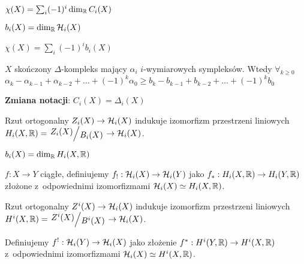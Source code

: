 

 


\begin{definicja}
	$\chi(X) = \sum_i (-1)^i \dim_{\mathbb{R}} C_i(X)$
\end{definicja}

\begin{definicja}
	$b_i(X) = \dim_{\mathbb{R}} {\mathcal{H}}_i(X)$
\end{definicja}

\begin{wniosek}
	$\chi(X) = \sum_i (-1)^i b_i(X)$
\end{wniosek}

\begin{wniosek}
	$X$ skończony $\Delta$-kompleks mający $\alpha_i$
	$i$-wymiarowych sympleksów. Wtedy $\forall_{k \geq 0}$
	${ \alpha_k - \alpha_{k-1} + \alpha_{k-2} + \ldots + (-1)^k \alpha_0
	\geq b_k - b_{k-1} + b_{k-2} + \ldots + (-1)^k b_0}$
\end{wniosek}

{\bf Zmiana notacji}: $C_i(X) = \Delta_i(X)$

\begin{stwierdzenie}
	Rzut ortogonalny $Z_i(X) \to {\mathcal{H}}_i(X)$ indukuje 
	izomorfizm przestrzeni liniowych
	$H_i(X, \R) = \bigslant{Z_i(X)}{B_i(X)} \to \H_i(X)$.
\end{stwierdzenie}

\begin{wniosek}
	$b_i(X) = \dim_{\mathbb{R}} H_i(X, {\mathbb{R}})$
\end{wniosek}

\begin{definicja}
	$f : X \to Y$ ciągłe, definiujemy ${f_! : {\mathcal{H}}_i(X) \to {\mathcal{H}}_i(Y)}$
	jako ${f_\ast:H_i(X, {\mathbb{R}}) \to H_i(Y, {\mathbb{R}})}$ złożone 
	z~odpowiednimi izomorfizmami ${\mathcal{H}}_i(X) \simeq H_i(X,{\mathbb{R}})$.
\end{definicja}

\begin{stwierdzenie}
	Rzut ortogonalny $Z^i(X) \to {\mathcal{H}}_i(X)$ indukuje
	izomorfizm przestrzeni liniowych
	$H^i(X, \R) = \bigslant{Z^i(X)}{B^i(X)} \to \H_i(X)$.
\end{stwierdzenie}

\begin{definicja}
	Definiujemy $f^!: {\mathcal{H}}_i(Y) \to {\mathcal{H}}_i(X)$ jako złożenie
	${f^\ast: H^i(Y, {\mathbb{R}}) \to H^i(X,{\mathbb{R}})}$ z~odpowiednimi
	izomorfizmami ${\mathcal{H}}_i(X) \simeq H^i(X, {\mathbb{R}})$.
\end{definicja}

